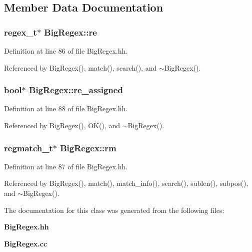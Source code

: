 \subsection{Member Data Documentation}
\subsubsection{\setlength{\rightskip}{0pt plus 5cm}regex\_\-t$\ast$ Big\-Regex::re\hspace{0.3cm}{\tt  [protected]}}\label{classBigRegex_n0}




Definition at line 86 of file Big\-Regex.hh.

Referenced by Big\-Regex(), match(), search(), and $\sim$Big\-Regex().
\subsubsection{\setlength{\rightskip}{0pt plus 5cm}bool$\ast$ Big\-Regex::re\_\-assigned\hspace{0.3cm}{\tt  [protected]}}\label{classBigRegex_n2}




Definition at line 88 of file Big\-Regex.hh.

Referenced by Big\-Regex(), OK(), and $\sim$Big\-Regex().
\subsubsection{\setlength{\rightskip}{0pt plus 5cm}regmatch\_\-t$\ast$ Big\-Regex::rm\hspace{0.3cm}{\tt  [protected]}}\label{classBigRegex_n1}




Definition at line 87 of file Big\-Regex.hh.

Referenced by Big\-Regex(), match(), match\_\-info(), search(), sublen(), subpos(), and $\sim$Big\-Regex().

The documentation for this class was generated from the following files:\begin{CompactItemize}
\item 
{\bf Big\-Regex.hh}\item 
{\bf Big\-Regex.cc}\end{CompactItemize}
